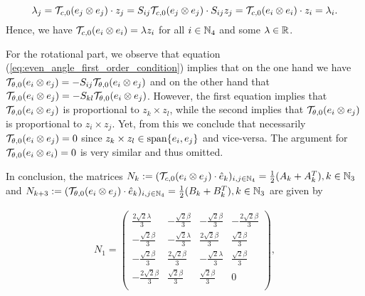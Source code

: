 \begin{equation}
\lambda_j = \mathcal{T}_{c,0}(e_j \otimes e_j) \cdot z_j = S_{ij} \mathcal{T}_{c,0}(e_j \otimes e_j) \cdot S_{ij} z_j = \mathcal{T}_{c,0}(e_i \otimes e_i) \cdot z_i = \lambda_i.
\end{equation}
Hence, we have $\mathcal{T}_{c,0}(e_i\otimes e_i) = \lambda z_i$ for all $i\in \mathbb{N}_4$ and some $\lambda \in \mathbb{R}$.

For the rotational part, we observe that equation (\ref{eq:even_angle_first_order_condition}) implies that on the one hand we have $\mathcal{T}_{\theta,0}(e_i \otimes e_j) = - S_{ij} \mathcal{T}_{\theta,0}(e_i \otimes e_j)$ and on the other hand that $\mathcal{T}_{\theta,0}(e_i \otimes e_j) = -S_{kl} \mathcal{T}_{\theta,0}(e_i \otimes e_j)$. However, the first equation implies that $\mathcal{T}_{\theta,0}(e_i \otimes e_j)$ is proportional to $z_k \times z_l$, while the second implies that $\mathcal{T}_{\theta,0}(e_i \otimes e_j)$ is proportional to $z_i \times z_j$. Yet, from this we conclude that necessarily $\mathcal{T}_{\theta,0}(e_i \otimes e_j) = 0$ since $z_k \times z_l \in \operatorname{span}\{e_i, e_j\}$ and vice-versa. The argument for $\mathcal{T}_{\theta,0}(e_i \otimes e_i)  = 0$ is very similar and thus omitted.

In conclusion, the matrices $N_k :=( \mathcal{T}_{c,0}(e_i \otimes e_j)\cdot  \hat{e}_k)_{i,j \in \mathbb{N}_4}  = \tfrac{1}{2}(A_k + A_k^T), k \in \mathbb{N}_3$ and $N_{k + 3} := ( \mathcal{T}_{\theta,0}(e_i \otimes e_j)\cdot  \hat{e}_k)_{i,j \in \mathbb{N}_4}  = \tfrac{1}{2}(B_k + B_k^T), k \in \mathbb{N}_3$ are given by

\renewcommand{\arraystretch}{1.2}
\begin{align}
 N_1 = \left(
\begin{array}{cccc}
 \frac{2 \sqrt{2} \lambda}{3} & -\frac{\sqrt{2} \beta}{3} & -\frac{\sqrt{2}  \beta}{3} & -\frac{2
   \sqrt{2}  \beta}{3} \\
 -\frac{\sqrt{2}  \beta}{3} & -\frac{\sqrt{2} \lambda}{3} & \frac{2 \sqrt{2}  \beta}{3} & \frac{\sqrt{2}
    \beta}{3} \\
 -\frac{\sqrt{2}  \beta}{3} & \frac{2 \sqrt{2}  \beta}{3} & -\frac{\sqrt{2} \lambda}{3} & \frac{\sqrt{2}
    \beta}{3} \\
 -\frac{2 \sqrt{2}  \beta}{3} & \frac{\sqrt{2}  \beta}{3} & \frac{\sqrt{2}  \beta}{3} & 0 \\
\end{array}
\right),
\end{align}

